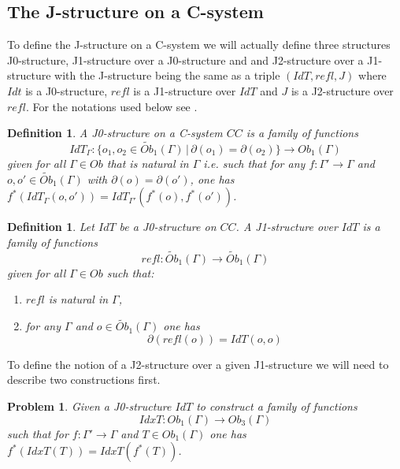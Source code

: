 \documentclass[12pt]{article}
\newenvironment{eq}{\begin{equation}}{\end{equation}}
\newtheorem{definition}[proposition]{Definition}
\newtheorem{problem}[proposition]{Problem}
\newcommand{\llabel}[1]{\label{#1}}
\newcommand{\sr}{\rightarrow}
\newcommand{\wt}{\widetilde}
\begin{document}
\subsection{The J-structure on a C-system}
%


To define the J-structure on a C-system we will actually define three structures J0-structure, J1-structure over a J0-structure and and J2-structure over a J1-structure with the J-structure being the same as a triple $(IdT,refl,J)$ where $Idt$ is a J0-structure, $refl$ is a J1-structure over $IdT$ and $J$ is a J2-structure over $refl$. For the notations used below see \cite{fromunivwithPi}.
%
\begin{definition}
\llabel{2015.03.27.def1}
A J0-structure on a C-system $CC$ is a family of functions 
%
$$IdT_{\Gamma}:\{o_1,o_2\in \wt{Ob}_1(\Gamma)\,|\,\partial(o_1)=\partial(o_2)\}\sr Ob_1(\Gamma)$$
%
given for all $\Gamma\in Ob$ that is natural in $\Gamma$ i.e. such that for any $f:\Gamma'\sr \Gamma$ and $o,o'\in \wt{Ob}_1(\Gamma)$ with $\partial(o)=\partial(o')$, one has $f^*(IdT_{\Gamma}(o,o'))=IdT_{\Gamma'}(f^*(o),f^*(o'))$.
\end{definition}
%
\begin{definition}
\llabel{2015.03.27.def2}
Let $IdT$ be a J0-structure on $CC$. A J1-structure over $IdT$ is a family of functions
%
$$refl:\wt{Ob}_1(\Gamma)\sr \wt{Ob}_1(\Gamma)$$
%
given for all $\Gamma\in Ob$ such that:
%
\begin{enumerate}
\item $refl$ is natural in $\Gamma$,
\item for any $\Gamma$ and $o\in \wt{Ob}_1(\Gamma)$ one has 
%
\begin{eq}
\llabel{2015.03.27.eq8}
\partial(refl(o))=IdT(o,o)
\end{eq}
\end{enumerate}
\end{definition}
%
To define the notion of a J2-structure over a given J1-structure we will need to describe two constructions first.
%
\begin{problem}
\llabel{2015.03.27.prob1}
Given a J0-structure $IdT$ to construct a family of functions
%
$$IdxT:Ob_1(\Gamma)\sr Ob_3(\Gamma)$$
%
such that for $f:\Gamma'\sr \Gamma$ and $T\in Ob_1(\Gamma)$ one has $f^*(IdxT(T))=IdxT(f^*(T))$.
\end{problem}
%
\end{document}
